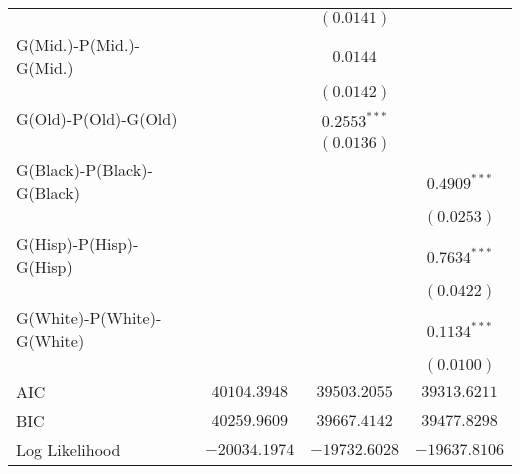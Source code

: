 \begin{center}
\begin{longtable}{l c c c}
                           &                & $(0.0141)$      &                 \\
G(Mid.)-P(Mid.)-G(Mid.)    &                & $0.0144$        &                 \\
                           &                & $(0.0142)$      &                 \\
G(Old)-P(Old)-G(Old)       &                & $0.2553^{***}$  &                 \\
                           &                & $(0.0136)$      &                 \\
G(Black)-P(Black)-G(Black) &                &                 & $0.4909^{***}$  \\
                           &                &                 & $(0.0253)$      \\
G(Hisp)-P(Hisp)-G(Hisp)    &                &                 & $0.7634^{***}$  \\
                           &                &                 & $(0.0422)$      \\
G(White)-P(White)-G(White) &                &                 & $0.1134^{***}$  \\
                           &                &                 & $(0.0100)$      \\
\midrule
AIC                        & $40104.3948$   & $39503.2055$    & $39313.6211$    \\
BIC                        & $40259.9609$   & $39667.4142$    & $39477.8298$    \\
Log Likelihood             & $-20034.1974$  & $-19732.6028$   & $-19637.8106$   \\
\end{longtable}
\end{center}

